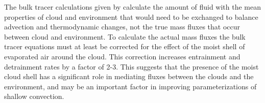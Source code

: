 \documentclass[draft,grl]{AGUTeX}
\begin{document}
\begin{article}
The bulk tracer calculations given by \cite{Siebesma1995} calculate the amount
of fluid with the mean properties of cloud and environment that would need to
be exchanged to balance advection and thermodynamic changes, not the true mass
fluxes that occur between cloud and environment.  To calculate the actual mass
fluxes the bulk tracer equations must at least be corrected for the effect of
the moist shell of evaporated air around the cloud.  This correction increases
entrainment and detrainment rates by a factor of 2-3.  This suggests that the
presence of the moist cloud shell has a significant role in mediating fluxes
between the clouds and the environment, and may be an important factor in 
improving parameterizations of shallow convection.



%
%
%
%
%
%


\end{article}
\end{document}
